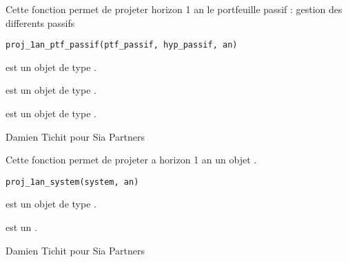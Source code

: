 \documentclass[a4paper]{book}
\begin{document}
%
\begin{Description}\relax
Cette fonction permet de projeter horizon 1 an le portfeuille passif : gestion des differents passifs
\end{Description}
%
\begin{Usage}
\begin{verbatim}
proj_1an_ptf_passif(ptf_passif, hyp_passif, an)
\end{verbatim}
\end{Usage}
%
\begin{Arguments}
\begin{ldescription}
\item[\code{ptf\_passif}] est un objet de type .

\item[\code{hyp\_passif}] est un objet de type .

\item[\code{an}] est un objet de type .
\end{ldescription}
\end{Arguments}
%
\begin{Author}\relax
Damien Tichit pour Sia Partners
\end{Author}
%
\begin{Description}\relax
Cette fonction permet de projeter a horizon 1 an un objet .
\end{Description}
%
\begin{Usage}
\begin{verbatim}
proj_1an_system(system, an)
\end{verbatim}
\end{Usage}
%
\begin{Arguments}
\begin{ldescription}
\item[\code{system}] est un objet de type .

\item[\code{an}] est un .
\end{ldescription}
\end{Arguments}
%
\begin{Author}\relax
Damien Tichit pour Sia Partners
\end{Author}
\end{document}
